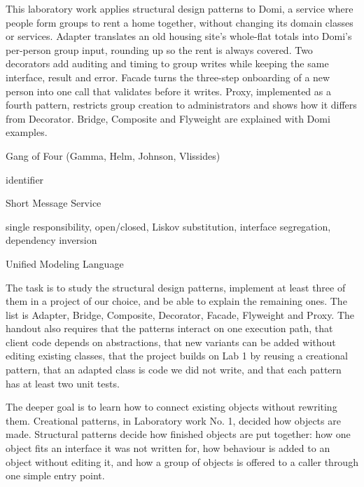 \documentclass{utmreport}
\begin{document}
\makeutmreporttitlepage
\tableofcontents
\begin{utmabstract}[Abstract]
This laboratory work applies structural design patterns to Domi, a service where people form groups to rent a home together, without changing its domain classes or services. Adapter translates an old housing site's whole-flat totals into Domi's per-person group input, rounding up so the rent is always covered. Two decorators add auditing and timing to group writes while keeping the same interface, result and error. Facade turns the three-step onboarding of a new person into one call that validates before it writes. Proxy, implemented as a fourth pattern, restricts group creation to administrators and shows how it differs from Decorator. Bridge, Composite and Flyweight are explained with Domi examples.

\end{utmabstract}

\begin{utmabbreviations}
\item[GoF] Gang of Four (Gamma, Helm, Johnson, Vlissides)
\item[ID] identifier
\item[SMS] Short Message Service
\item[SOLID] single responsibility, open/closed, Liskov substitution, interface segregation, dependency inversion
\item[UML] Unified Modeling Language
\end{utmabbreviations}

\utmintroduction
The task is to study the structural design patterns, implement at least three of them in a project of our choice, and be able to explain the remaining ones. The list is Adapter, Bridge, Composite, Decorator, Facade, Flyweight and Proxy. The handout also requires that the patterns interact on one execution path, that client code depends on abstractions, that new variants can be added without editing existing classes, that the project builds on Lab 1 by reusing a creational pattern, that an adapted class is code we did not write, and that each pattern has at least two unit tests.

The deeper goal is to learn how to connect existing objects without rewriting them. Creational patterns, in Laboratory work No. 1, decided how objects are made. Structural patterns decide how finished objects are put together: how one object fits an interface it was not written for, how behaviour is added to an object without editing it, and how a group of objects is offered to a caller through one simple entry point.
\end{document}
